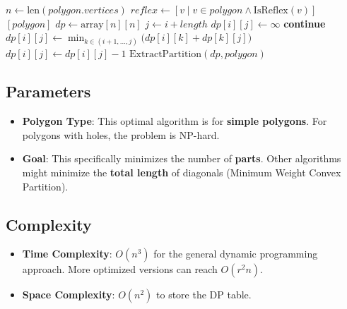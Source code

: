 \begin{algorithm}[htbp]
\caption{Minimum Convex Partition via Dynamic Programming}
\label{alg:convex_partition}
\begin{algorithmic}[1]
  \State $n \gets \text{len}(polygon.vertices)$
  \State $reflex \gets [v \mid v \in polygon \wedge \text{IsReflex}(v)]$
    \State \Return $[polygon]$
  \EndIf
  \State $dp \gets \text{array}[n][n]$
      \State $j \gets i + length$
        \State $dp[i][j] \gets \infty$
        \State \textbf{continue}
      \EndIf
      \State $dp[i][j] \gets \min_{k \in (i+1,\ldots,j)} \bigl(dp[i][k] + dp[k][j]\bigr)$
        \State $dp[i][j] \gets dp[i][j] - 1$
      \EndIf
    \EndFor
  \EndFor
  \State \Return $\text{ExtractPartition}(dp, polygon)$
\EndFunction
\end{algorithmic}
\end{algorithm}

\subsection{Parameters}

\begin{itemize}
\item \textbf{Polygon Type}: This optimal algorithm is for \textbf{simple polygons}. For polygons with holes, the problem is NP-hard.
\item \textbf{Goal}: This specifically minimizes the number of \textbf{parts}. Other algorithms might minimize the \textbf{total length} of diagonals (Minimum Weight Convex Partition).
\end{itemize}

\subsection{Complexity}

\begin{itemize}
\item \textbf{Time Complexity}: $O(n^3)$ for the general dynamic programming approach. More optimized versions can reach $O(r^2 n)$.
\item \textbf{Space Complexity}: $O(n^2)$ to store the DP table.
\end{itemize}

